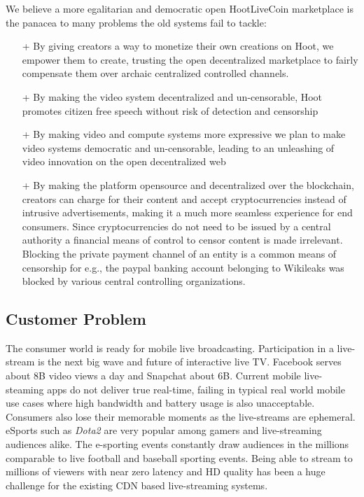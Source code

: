 \documentclass{article}
\begin{document}
We believe a more egalitarian and democratic open HootLiveCoin marketplace is the panacea to many problems the old systems fail to tackle:
\begin{itemize}
\item[+]By giving creators a way to monetize their own creations on Hoot, we empower them to create, trusting the open decentralized marketplace to fairly compensate them over archaic centralized controlled channels.
\item[+]By making the video system decentralized and un-censorable, Hoot promotes citizen free speech without risk of detection and censorship
\item[+]By making video and compute systems more expressive we plan to make video systems democratic and un-censorable, leading to an unleashing of video innovation on the open decentralized web
\item[+]By making the platform opensource and decentralized over the blockchain, creators can charge for their content and accept cryptocurrencies instead of intrusive advertisements, making it a much more seamless experience for end consumers. Since cryptocurrencies do not need to be issued by a central authority a financial means of control to censor content is made irrelevant. Blocking the private payment channel of an entity is a common means of censorship for e.g., the paypal banking account belonging to Wikileaks was blocked by various central controlling organizations.
\end{itemize}


\iffalse
\subsection{Customer Problem}
The consumer world is ready for mobile live broadcasting. Participation in a live-stream is the next big wave and future of interactive live TV. Facebook serves about 8B video views a day and Snapchat about 6B. Current mobile live-steaming apps do not deliver true real-time, failing in typical real world mobile use cases where high bandwidth and battery usage is also unacceptable. Consumers also lose their memorable moments as the live-streams are ephemeral. eSports such as \emph{Dota2} are very popular among gamers and live-streaming audiences alike. The e-sporting events constantly draw audiences in the millions comparable to live football and baseball sporting events. Being able to stream to millions of viewers with near zero latency and HD quality has been a huge challenge for the existing CDN based live-streaming systems.
\end{document}
